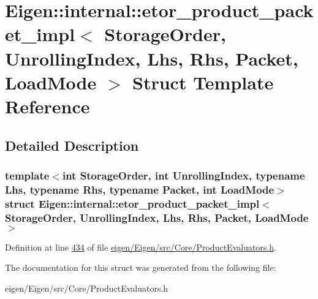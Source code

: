 \hypertarget{struct_eigen_1_1internal_1_1etor__product__packet__impl}{}\section{Eigen\+:\+:internal\+:\+:etor\+\_\+product\+\_\+packet\+\_\+impl$<$ Storage\+Order, Unrolling\+Index, Lhs, Rhs, Packet, Load\+Mode $>$ Struct Template Reference}
\label{struct_eigen_1_1internal_1_1etor__product__packet__impl}


\subsection{Detailed Description}
\subsubsection*{template$<$int Storage\+Order, int Unrolling\+Index, typename Lhs, typename Rhs, typename Packet, int Load\+Mode$>$\newline
struct Eigen\+::internal\+::etor\+\_\+product\+\_\+packet\+\_\+impl$<$ Storage\+Order, Unrolling\+Index, Lhs, Rhs, Packet, Load\+Mode $>$}



Definition at line \hyperlink{eigen_2_eigen_2src_2_core_2_product_evaluators_8h_source_l00434}{434} of file \hyperlink{eigen_2_eigen_2src_2_core_2_product_evaluators_8h_source}{eigen/\+Eigen/src/\+Core/\+Product\+Evaluators.\+h}.



The documentation for this struct was generated from the following file\+:\begin{DoxyCompactItemize}
\item 
eigen/\+Eigen/src/\+Core/\+Product\+Evaluators.\+h\end{DoxyCompactItemize}
